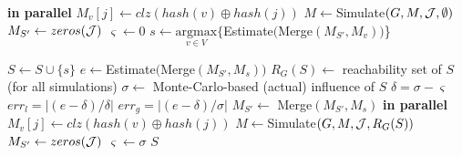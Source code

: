 \renewcommand{\baselinestretch}{0.95}
\begin{algorithm}
\caption{\sc{\acro}($G,K,{\cal J}$)}
\label{algo:main}
\begin{algorithmic}[1]
     {\bf in parallel}
            \State $M_v[j] \leftarrow clz(hash(v) \oplus hash(j))$ 
        \EndFor
    \EndFor
    \State $M \leftarrow ${\sc Simulate}$(G,M,{\cal J},\emptyset)$
    \State $M_{S'} \leftarrow zeros({\cal J})$
    \State $\varsigma \leftarrow 0$
     \label{line:for}
        \State $s \leftarrow \underset{v\in V}{\mathrm{argmax}}\{${\sc Estimate}$(${\sc Merge}$(M_{S'},M_v))$\}\label{line:estimate}
        
        \State $S \leftarrow S \cup \{s\}$     
        \State $e \leftarrow ${\sc Estimate}$(${\sc Merge}$(M_{S'},M_s))$\label{line:e}
        \State $R_G(S) \leftarrow$ reachability set of $S$ (for all simulations)
        \State $\sigma \leftarrow$ Monte-Carlo-based (actual) influence of $S$
        \State $\delta = \sigma - \varsigma$
        \State $err_l=|(e - \delta) / \delta|$
        \State $err_g=|(e-\delta) / \sigma|$
            \State $M_{S'} \leftarrow$ {\sc Merge}$(M_{S'},M_s)$ \label{line:if}
        \Else 
             {\bf in parallel}\label{line:else1}
                    \State $M_v[j] \leftarrow clz(hash(v) \oplus hash(j))$ 
                \EndFor
            \EndFor
            \State $M \leftarrow ${\sc Simulate}$(G,M,{\cal J},R_{G}(S))$
            \State $M_{S'} \leftarrow zeros({\cal J}) $ 
            \State $\varsigma \leftarrow \sigma $ \label{line:else2} 
        \EndIf
    \EndFor
    \State \Return $S$
\end{algorithmic}
\end{algorithm}
\renewcommand{\baselinestretch}{1}

